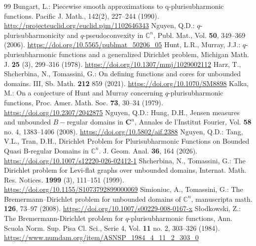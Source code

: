 \documentclass[10pt,a4paper]{amsart}
\numberwithin{equation}{section}
\newcommand{\cbb}{\mathbb{C}}
\begin{document}
\begin{thebibliography}{99}
 Bungart, L.: Piecewise smooth approximations to q-plurisubharmonic functions. Pacific J. Math., 142(2), 227--244 (1990). \href{http://projecteuclid.org/euclid.pjm/1102646343}{http://projecteuclid.org/euclid.pjm/1102646343}
 Nguyen, Q.D.: $q$-plurisubharmonicity and $q$-pseudoconvexity in $\cbb^n$, Publ. Mat., Vol. \textbf{50}, 349--369 (2006). \href{https://doi.org/10.5565/publmat\_50206\_05}{https://doi.org/10.5565/publmat\_50206\_05}
 Hunt, L.R., Murray, J.J.: $q$-plurisubharmonic functions and a generalized Dirichlet problem, Michigan Math. J. \textbf{25} (3), 299--316 (1978). \href{https://doi.org/10.1307/mmj/1029002112}{https://doi.org/10.1307/mmj/1029002112}
 Harz, T., Shcherbina, N., Tomassini, G.: On defining functions and cores for unbounded domains. III, Sb. Math. \textbf{212} 859 (2021). \href{https://doi.org/10.1070/SM8898}{https://doi.org/10.1070/SM8898}
 Kalka, M.: On a conjecture of Hunt and Murray concerning $q$-plurisubharmonic functions, Proc. Amer. Math. Soc. \textbf{73}, 30--34 (1979). \href{https://doi.org/10.2307/2042875}{https://doi.org/10.2307/2042875}
 Nguyen, Q.D.: Hung, D.H., Jensen measures and unbounded $B-$regular domains in ${\mathbf{C}}^n$, Annales de l'Institut Fourier, Vol. \textbf{58} no. 4, 1383--1406 (2008). \href{https://doi.org/10.5802/aif.2388}{https://doi.org/10.5802/aif.2388}
 Nguyen, Q.D.: Tang, V.L., Tran, D.H., Dirichlet Problem for Plurisubharmonic Functions on Bounded Quasi B-regular Domains in $\cbb^n$. J. Geom. Anal. \textbf{36}, 164 (2026). \href{https://doi.org/10.1007/s12220-026-02412-1}{https://doi.org/10.1007/s12220-026-02412-1}
 Shcherbina, N., Tomassini, G.: The Dirichlet problem for Levi-flat graphs over unbounded domains, Internat. Math. Res. Notices. \textbf{1999} (3), 111--151 (1999). \href{https://doi.org/10.1155/S1073792899000069}{https://doi.org/10.1155/S1073792899000069}
 Simioniuc, A., Tomassini, G.: The Bremermann–Dirichlet problem for unbounded domains of $\mathbb{C}^n$, manuscripta math. \textbf{126}, 73–97 (2008). \href{https://doi.org/10.1007/s00229-008-0167-x}{https://doi.org/10.1007/s00229-008-0167-x}
 S{\l}odkowski, Z.: The Bremermann-Dirichlet problem for $q$-plurisubharmonic functions, Ann. Scuola Norm. Sup. Pisa Cl. Sci., Serie 4, Vol. \textbf{11} no. 2, 303--326 (1984). \href{https://www.numdam.org/item/ASNSP\_1984\_4\_11\_2\_303\_0}{https://www.numdam.org/item/ASNSP\_1984\_4\_11\_2\_303\_0}

\end{thebibliography}
\end{document}
